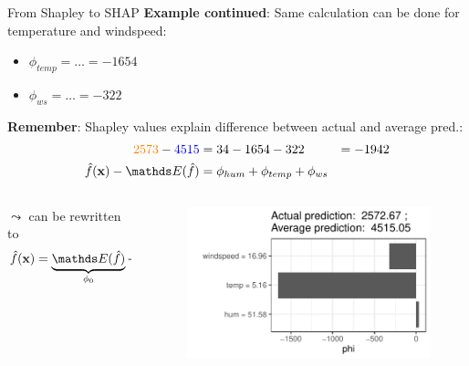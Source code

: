 \documentclass[11pt,compress,t,notes=noshow, aspectratio=169, xcolor=table]{beamer}
\begin{document}
\begin{frame}{From Shapley to SHAP}
\textbf{Example continued}: Same calculation can be done for temperature and windspeed:
\begin{itemize}
    \item $\phi_{temp} = \ldots = -1654$
    \item $\phi_{ws} = \ldots = -322$
\end{itemize}

\textbf{Remember}: Shapley values explain difference between actual and average pred.:
\begin{eqnarray*}
\color{orange}{2573} \color{black}- \color{blue}{4515} \color{black} &= 34 - 1654 - 322 &= - 1942\\
\fh(\xv) - \E(\fh) &= \phi_{hum} + \phi_{temp} + \phi_{ws}&\\
\end{eqnarray*}
\begin{columns}[T]
\begin{column}{0.5\textwidth}
$\leadsto$ can be rewritten to
$$
\fh(\xv) = \underbrace{\E(\fh)}_{\phi_0} + \phi_{hum} + \phi_{temp} + \phi_{ws}
$$
\end{column}
\begin{column}{0.5\textwidth}
\vspace{-1cm}
\begin{figure}
    \centering
    \includegraphics[width=0.9\columnwidth]{figure/shapley2shap.pdf}
\end{figure}
\end{column}
\end{columns}
\end{frame}
\end{document}
